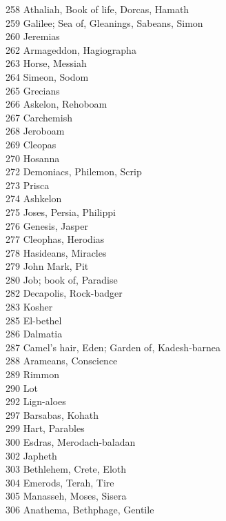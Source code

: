 258 \quad Athaliah, Book of life, Dorcas, Hamath\\
259 \quad Galilee; Sea of, Gleanings, Sabeans, Simon\\
260 \quad Jeremias\\
262 \quad Armageddon, Hagiographa\\
263 \quad Horse, Messiah\\
264 \quad Simeon, Sodom\\
265 \quad Grecians\\
266 \quad Askelon, Rehoboam\\
267 \quad Carchemish\\
268 \quad Jeroboam\\
269 \quad Cleopas\\
270 \quad Hosanna\\
272 \quad Demoniacs, Philemon, Scrip\\
273 \quad Prisca\\
274 \quad Ashkelon\\
275 \quad Joses, Persia, Philippi\\
276 \quad Genesis, Jasper\\
277 \quad Cleophas, Herodias\\
278 \quad Hasideans, Miracles\\
279 \quad John Mark, Pit\\
280 \quad Job; book of, Paradise\\
282 \quad Decapolis, Rock-badger\\
283 \quad Kosher\\
285 \quad El-bethel\\
286 \quad Dalmatia\\
287 \quad Camel’s hair, Eden; Garden of, Kadesh-barnea\\
288 \quad Arameans, Conscience\\
289 \quad Rimmon\\
290 \quad Lot\\
292 \quad Lign-aloes\\
297 \quad Barsabas, Kohath\\
299 \quad Hart, Parables\\
300 \quad Esdras, Merodach-baladan\\
302 \quad Japheth\\
303 \quad Bethlehem, Crete, Eloth\\
304 \quad Emerods, Terah, Tire\\
305 \quad Manasseh, Moses, Sisera\\
306 \quad Anathema, Bethphage, Gentile\\
